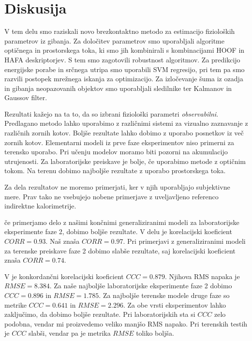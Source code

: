 \chapter{Diskusija}\label{sec:diskusija}
V tem delu smo raziskali novo brezkontaktno metodo za estimacijo fizioloških parametrov iz gibanja. Za določitev parametrov smo uporabljali algoritme optičnega in prostorskega toka, ki smo jih kombinirali s kombinacijami HOOF in HAFA deskriptorjev. S tem smo zagotovili robustnost algoritmov. Za predikcijo energijske porabe in srčnega utripa smo uporabili SVM regresijo, pri tem pa smo razvili \nurbf postopek mrežnega iskanja za optimizacijo. Za izločevanje šuma iz ozadja in gibanja neopazovanih objektov smo uporabljali sledilnike ter Kalmanov in Gaussov filter.

Rezultati kažejo na ta to, da so izbrani fiziološki parametri \emph{observabilni}. Predlagano metodo lahko uporabimo z različnimi sistemi za vizualno zaznavanje z različnih zornih kotov. Boljše rezultate lahko dobimo z uporabo posnetkov iz več zornih kotov. Elementarni modeli iz prve faze eksperimentov niso primerni za terensko uporabo. Pri učenju modelov moramo biti pozorni na akumulacijo utrujenosti. Za laboratorijske preiskave je bolje, če uporabimo metode z optičnim tokom. Na terenu dobimo najboljše rezultate z uporabo prostorskega toka.

Za dela \cite{peker2004framework,silva2015assessing,osgnach2010energy} rezultatov ne moremo primerjati, ker v njih uporabljajo subjektivne mere. Prav tako ne vsebujejo nobene primerjave z uveljavljeno referenco indirektne kalorimetrije.

če primerjamo delo \cite{botton2011energy} z našimi končnimi generaliziranimi modeli za laboratorijske eksperimente faze 2, dobimo boljše rezultate. V delu \cite{botton2011energy} je korelacijski koeficient $CORR=0.93$. Naš znaša $CORR=0.97$. Pri primerjavi z generaliziranimi modeli za terenske preiskave faze 2 dobimo slabše rezultate, saj korelacijski koeficient znaša $CORR=0.74$.

V \cite{nathan2015estimating} je konkordančni korelacijski koeficient $CCC=0.879$. Njihova RMS napaka je $RMSE=8.384$. Za naše najboljše laboratorijske eksperimente faze 2 dobimo $CCC=0.896$ in $RMSE=1.785$. Za najboljše terenske modele druge faze so metrike  $CCC=0.641$ in $RMSE=2.296$. Za obe vrsti eksperimentov lahko zaključimo, da dobimo boljše rezultate. Pri laboratorijskih sta si $CCC$ zelo podobna, vendar mi proizvedemo veliko manjšo RMS napako. Pri terenskih testih je $CCC$ slabši, vendar pa je metrika $RMSE$ toliko boljša.

